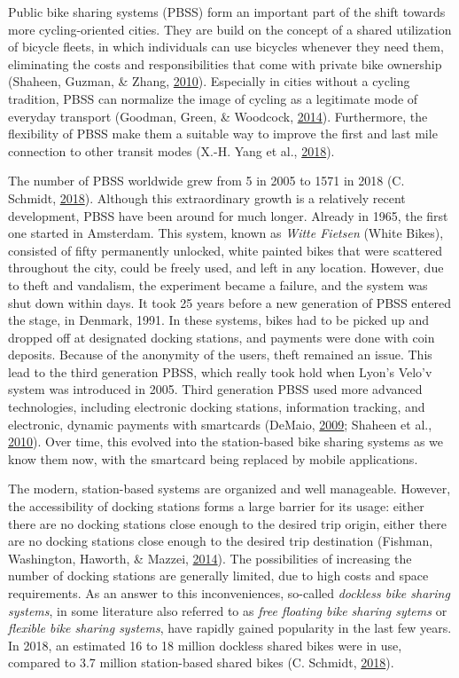 \documentclass[12pt,oneside]{reedthesis}
\begin{document}
Public bike sharing systems (PBSS) form an important part of the shift
towards more cycling-oriented cities. They are build on the concept of a
shared utilization of bicycle fleets, in which individuals can use
bicycles whenever they need them, eliminating the costs and
responsibilities that come with private bike ownership (Shaheen, Guzman,
\& Zhang, \protect\hyperlink{ref-shaheen2010}{2010}). Especially in
cities without a cycling tradition, PBSS can normalize the image of
cycling as a legitimate mode of everyday transport (Goodman, Green, \&
Woodcock, \protect\hyperlink{ref-goodman2014}{2014}). Furthermore, the
flexibility of PBSS make them a suitable way to improve the first and
last mile connection to other transit modes (X.-H. Yang et al.,
\protect\hyperlink{ref-yang2018}{2018}).

The number of PBSS worldwide grew from 5 in 2005 to 1571 in 2018 (C.
Schmidt, \protect\hyperlink{ref-schmidt2018}{2018}). Although this
extraordinary growth is a relatively recent development, PBSS have been
around for much longer. Already in 1965, the first one started in
Amsterdam. This system, known as \emph{Witte Fietsen} (White Bikes),
consisted of fifty permanently unlocked, white painted bikes that were
scattered throughout the city, could be freely used, and left in any
location. However, due to theft and vandalism, the experiment became a
failure, and the system was shut down within days. It took 25 years
before a new generation of PBSS entered the stage, in Denmark, 1991. In
these systems, bikes had to be picked up and dropped off at designated
docking stations, and payments were done with coin deposits. Because of
the anonymity of the users, theft remained an issue. This lead to the
third generation PBSS, which really took hold when Lyon's Velo'v system
was introduced in 2005. Third generation PBSS used more advanced
technologies, including electronic docking stations, information
tracking, and electronic, dynamic payments with smartcards (DeMaio,
\protect\hyperlink{ref-demaio2009}{2009}; Shaheen et al.,
\protect\hyperlink{ref-shaheen2010}{2010}). Over time, this evolved into
the station-based bike sharing systems as we know them now, with the
smartcard being replaced by mobile applications.

The modern, station-based systems are organized and well manageable.
However, the accessibility of docking stations forms a large barrier for
its usage: either there are no docking stations close enough to the
desired trip origin, either there are no docking stations close enough
to the desired trip destination (Fishman, Washington, Haworth, \&
Mazzei, \protect\hyperlink{ref-fishman2014}{2014}). The possibilities of
increasing the number of docking stations are generally limited, due to
high costs and space requirements. As an answer to this inconveniences,
so-called \emph{dockless bike sharing systems}, in some literature also
referred to as \emph{free floating bike sharing sytems} or
\emph{flexible bike sharing systems}, have rapidly gained popularity in
the last few years. In 2018, an estimated 16 to 18 million dockless
shared bikes were in use, compared to 3.7 million station-based shared
bikes (C. Schmidt, \protect\hyperlink{ref-schmidt2018}{2018}).
\end{document}

